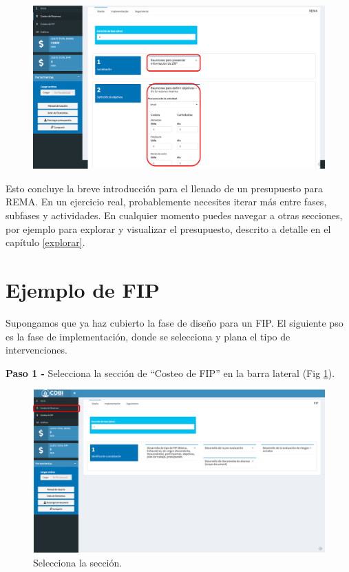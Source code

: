 \documentclass[
]{book}
\begin{document}
\begin{figure}
\includegraphics[width=61.11in]{images/rema_dis_7} \end{figure}

Esto concluye la breve introducción para el llenado de un presupuesto para REMA. En un ejercicio real, probablemente necesites iterar más entre fases, subfases y actividades. En cualquier momento puedes navegar a otras secciones, por ejemplo para explorar y visualizar el presupuesto, descrito a detalle en el capítulo \ref{explorar}.

\hypertarget{fip}{%
\section{Ejemplo de FIP}\label{fip}}

Supongamos que ya haz cubierto la fase de diseño para un FIP. El siguiente pso es la fase de implementación, donde se selecciona y plana el tipo de intervenciones.

\textbf{Paso 1 - } Selecciona la sección de ``Costeo de FIP'' en la barra lateral (Fig \ref{fig:fip-imp-1}).

\begin{figure}
\includegraphics[width=61.24in]{images/fip-imp-1} \caption{Selecciona la sección.}\label{fig:fip-imp-1}
\end{figure}
\end{document}
